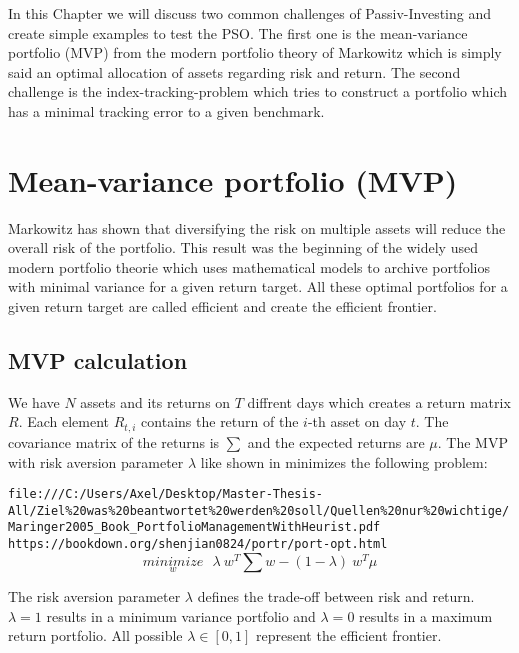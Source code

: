 \documentclass[
  oneside]{book}
\begin{document}
In this Chapter we will discuss two common challenges of Passiv-Investing and create simple examples to test the PSO. The first one is the mean-variance portfolio (MVP) from the modern portfolio theory of Markowitz which is simply said an optimal allocation of assets regarding risk and return. The second challenge is the index-tracking-problem which tries to construct a portfolio which has a minimal tracking error to a given benchmark.

\hypertarget{mean-variance-portfolio-mvp}{%
\section{Mean-variance portfolio (MVP)}\label{mean-variance-portfolio-mvp}}

Markowitz has shown that diversifying the risk on multiple assets will reduce the overall risk of the portfolio. This result was the beginning of the widely used modern portfolio theorie which uses mathematical models to archive portfolios with minimal variance for a given return target. All these optimal portfolios for a given return target are called efficient and create the efficient frontier.

\hypertarget{mvp-calculation}{%
\subsection{MVP calculation}\label{mvp-calculation}}

We have \(N\) assets and its returns on \(T\) diffrent days which creates a return matrix \(R\). Each element \(R_{t,i}\) contains the return of the \(i\)-th asset on day \(t\). The covariance matrix of the returns is \(\textstyle\sum\) and the expected returns are \(\mu\). The MVP with risk aversion parameter \(\lambda\) like shown in \citep{Mar2005} minimizes the following problem:

\texttt{file:///C:/Users/Axel/Desktop/Master-Thesis-All/Ziel\%20was\%20beantwortet\%20werden\%20soll/Quellen\%20nur\%20wichtige/Maringer2005\_Book\_PortfolioManagementWithHeurist.pdf}
\texttt{https://bookdown.org/shenjian0824/portr/port-opt.html}
\begin{equation} 
\underset{w}{minimize} \ \ \ \lambda \ w^T \textstyle\sum w - (1-\lambda) \ w^T\mu
\label{eq:MVP}
\end{equation}

The risk aversion parameter \(\lambda\) defines the trade-off between risk and return. \(\lambda = 1\) results in a minimum variance portfolio and \(\lambda = 0\) results in a maximum return portfolio. All possible \(\lambda \in [0, 1]\) represent the efficient frontier.
\end{document}
